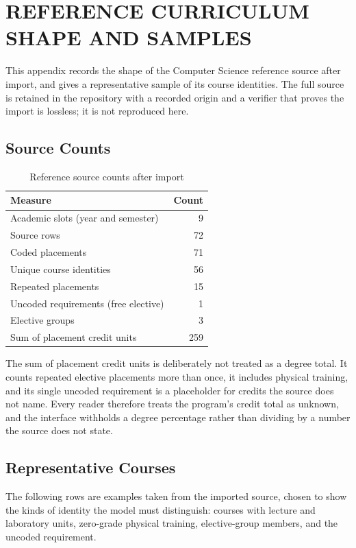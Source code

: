 \chapter{REFERENCE CURRICULUM SHAPE AND SAMPLES}

This appendix records the shape of the Computer Science reference source after import, and gives a
representative sample of its course identities. The full source is retained in the repository with a
recorded origin and a verifier that proves the import is lossless; it is not reproduced here.

\section{Source Counts}

\begin{table}[h]
\centering
\small
\begin{tabular}{lr}
\toprule
\textbf{Measure} & \textbf{Count} \\
\midrule
Academic slots (year and semester) & 9 \\
Source rows & 72 \\
Coded placements & 71 \\
Unique course identities & 56 \\
Repeated placements & 15 \\
Uncoded requirements (free elective) & 1 \\
Elective groups & 3 \\
Sum of placement credit units & 259 \\
\bottomrule
\end{tabular}
\caption{Reference source counts after import}
\end{table}

The sum of placement credit units is deliberately not treated as a degree total. It counts repeated
elective placements more than once, it includes physical training, and its single uncoded
requirement is a placeholder for credits the source does not name. Every reader therefore treats
the program's credit total as unknown, and the interface withholds a degree percentage rather than
dividing by a number the source does not state.

\section{Representative Courses}

The following rows are examples taken from the imported source, chosen to show the kinds of
identity the model must distinguish: courses with lecture and laboratory units, zero-grade physical
training, elective-group members, and the uncoded requirement.

